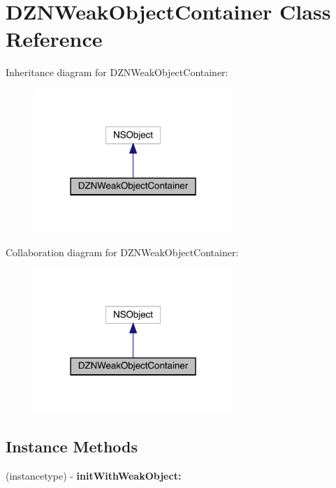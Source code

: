 \hypertarget{interface_d_z_n_weak_object_container}{}\section{D\+Z\+N\+Weak\+Object\+Container Class Reference}
\label{interface_d_z_n_weak_object_container}


Inheritance diagram for D\+Z\+N\+Weak\+Object\+Container\+:\nopagebreak
\begin{figure}[H]
\begin{center}
\leavevmode
\includegraphics[width=214pt]{interface_d_z_n_weak_object_container__inherit__graph}
\end{center}
\end{figure}


Collaboration diagram for D\+Z\+N\+Weak\+Object\+Container\+:\nopagebreak
\begin{figure}[H]
\begin{center}
\leavevmode
\includegraphics[width=214pt]{interface_d_z_n_weak_object_container__coll__graph}
\end{center}
\end{figure}
\subsection*{Instance Methods}
\begin{DoxyCompactItemize}
\item 
\mbox{\label{interface_d_z_n_weak_object_container_accaf24bda0f51471c609672db63d7f74}} 
(instancetype) -\/ {\bfseries init\+With\+Weak\+Object\+:}
\end{DoxyCompactItemize}
